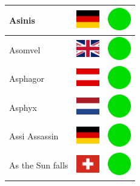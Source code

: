 \documentclass[12pt, a4paper, twoside]{report}
\begin{document}
\begin{center}
\begin{longtable}{|p{5cm}|p{2cm}|p{2cm}|}
 Asinis                                                     & \includegraphics[width=1cm]{../img/flags/de} &   \includegraphics[width=1cm]{../likes/y} \\ \hline
 Asomvel                                                    & \includegraphics[width=1cm]{../img/flags/gb} &   \includegraphics[width=1cm]{../likes/y} \\ \hline
 Asphagor                                                   & \includegraphics[width=1cm]{../img/flags/at} &   \includegraphics[width=1cm]{../likes/y} \\ \hline
 Asphyx                                                     & \includegraphics[width=1cm]{../img/flags/nl} &   \includegraphics[width=1cm]{../likes/y} \\ \hline
 Assi Assassin                                              & \includegraphics[width=1cm]{../img/flags/de} &   \includegraphics[width=1cm]{../likes/y} \\ \hline
 As the Sun falls                                           & \includegraphics[width=1cm]{../img/flags/ch} &   \includegraphics[width=1cm]{../likes/y} \\ \hline

\end{longtable}
\end{center}
\end{document}
